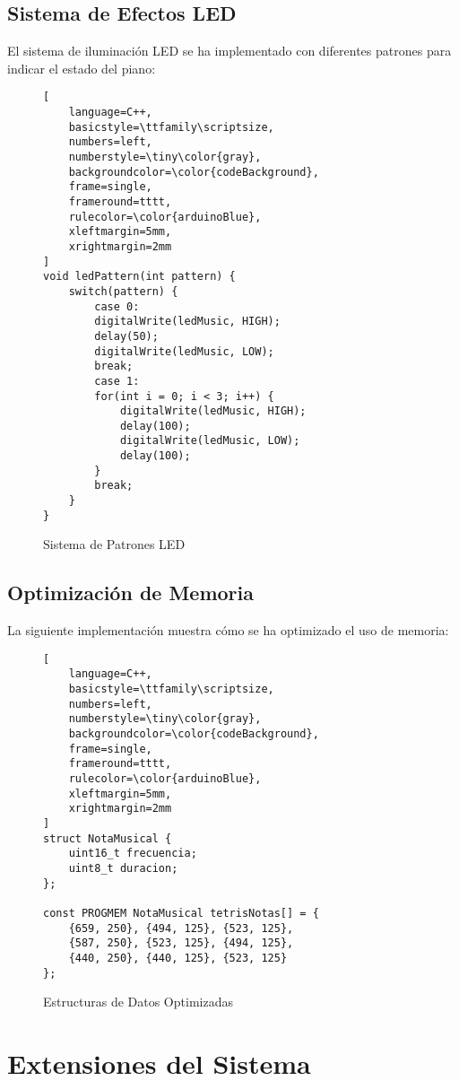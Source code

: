 \subsection{Sistema de Efectos LED}
El sistema de iluminación LED se ha implementado con diferentes patrones para indicar el estado del piano:

\begin{figure}[H]
\centering
\begin{lstlisting}[
	language=C++,
	basicstyle=\ttfamily\scriptsize,
	numbers=left,
	numberstyle=\tiny\color{gray},
	backgroundcolor=\color{codeBackground},
	frame=single,
	frameround=tttt,
	rulecolor=\color{arduinoBlue},
	xleftmargin=5mm,
	xrightmargin=2mm
]
void ledPattern(int pattern) {
	switch(pattern) {
		case 0:  
		digitalWrite(ledMusic, HIGH);
		delay(50);
		digitalWrite(ledMusic, LOW);
		break;
		case 1:  
		for(int i = 0; i < 3; i++) {
			digitalWrite(ledMusic, HIGH);
			delay(100);
			digitalWrite(ledMusic, LOW);
			delay(100);
		}
		break;
	}
}
\end{lstlisting}
\caption{Sistema de Patrones LED}
\label{fig:led-patterns}
\end{figure}

\subsection{Optimización de Memoria}
La siguiente implementación muestra cómo se ha optimizado el uso de memoria:

\begin{figure}[H]
\centering
\begin{lstlisting}[
	language=C++,
	basicstyle=\ttfamily\scriptsize,
	numbers=left,
	numberstyle=\tiny\color{gray},
	backgroundcolor=\color{codeBackground},
	frame=single,
	frameround=tttt,
	rulecolor=\color{arduinoBlue},
	xleftmargin=5mm,
	xrightmargin=2mm
]
struct NotaMusical {
	uint16_t frecuencia;
	uint8_t duracion;
};

const PROGMEM NotaMusical tetrisNotas[] = {
	{659, 250}, {494, 125}, {523, 125},
	{587, 250}, {523, 125}, {494, 125},
	{440, 250}, {440, 125}, {523, 125}
};
\end{lstlisting}
\caption{Estructuras de Datos Optimizadas}
\label{fig:optimized-structures}
\end{figure}

\section{Extensiones del Sistema}

